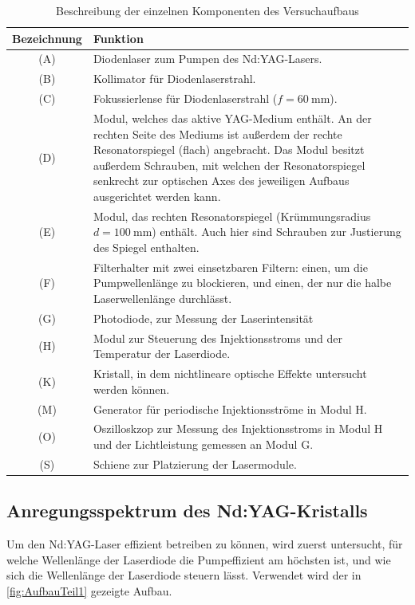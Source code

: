 \documentclass[../main.tex]{subfiles}
\begin{document}
        \begin{table}[H]
            \centering
            \begin{tabularx}{\textwidth}{cX}
                \textbf{Bezeichnung} & \textbf{Funktion}\\\hline\hline
                (A) & Diodenlaser zum Pumpen des Nd:YAG-Lasers.\\\hline
                (B) & Kollimator für Diodenlaserstrahl.\\\hline
                (C) & Fokussierlense für Diodenlaserstrahl ($f=\SI{60}{\milli\metre}$).\\\hline
                (D) & Modul, welches das aktive YAG-Medium enthält. An der rechten Seite des Mediums ist außerdem der rechte Resonatorspiegel (flach) angebracht. Das Modul besitzt außerdem Schrauben, mit welchen der Resonatorspiegel senkrecht zur optischen Axes des jeweiligen Aufbaus ausgerichtet werden kann. \\\hline
                (E) & Modul, das rechten Resonatorspiegel (Krümmungsradius $d=\SI{100}{\milli\metre}$) enthält. Auch hier sind Schrauben zur Justierung des Spiegel enthalten.\\\hline 
                (F) & Filterhalter mit zwei einsetzbaren Filtern: einen, um die Pumpwellenlänge zu blockieren, und einen, der nur die halbe Laserwellenlänge durchlässt.\\\hline
                (G) & Photodiode, zur Messung der Laserintensität\\\hline
                (H) & Modul zur Steuerung des Injektionsstroms und der Temperatur der Laserdiode.\\\hline
                (K) & Kristall, in dem nichtlineare optische Effekte untersucht werden können.\\\hline
                (M) & Generator für periodische Injektionsströme in Modul H.\\\hline
                (O) & Oszilloskzop zur Messung des Injektionsstroms in Modul H und der Lichtleistung gemessen an Modul G.\\\hline
                (S) & Schiene zur Platzierung der Lasermodule.\\\hline
            \end{tabularx}
            \caption{Beschreibung der einzelnen Komponenten des Versuchaufbaus}
            \label{tab:AufbauKomponentenErklaerung}
        \end{table}

    

    \subsection{Anregungsspektrum des Nd:YAG-Kristalls}
        Um den Nd:YAG-Laser effizient betreiben zu können, wird zuerst untersucht, für welche Wellenlänge der Laserdiode die Pumpeffizient am höchsten ist, und wie sich die Wellenlänge der Laserdiode steuern lässt. Verwendet wird der in \ref{fig:AufbauTeil1} gezeigte Aufbau.  
        
\end{document}
